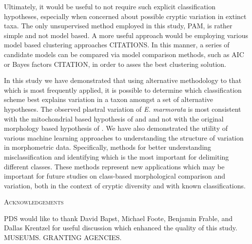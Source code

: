 \documentclass[12pt,letterpaper]{article}\usepackage{graphicx, color}
\renewcommand{\section}[1]{%
\bigskip
\begin{center}
\begin{Large}
\normalfont\scshape #1
\medskip
\end{Large}
\end{center}}
\begin{document}
Ultimately, it would be useful to not require such explicit classification hypotheses, especially when concerned about possible cryptic variation in extinct taxa. The only unsupervised method employed in this study, PAM, is rather simple and not model based. A more useful approach would be employing various model based clustering approaches CITATIONS. In this manner, a series of candidate models can be compared via model comparison methods, such as AIC or Bayes factors CITATION, in order to asses the best clustering solution.%


In this study we have demonstrated that using alternative methodology to that which is most frequently applied, it is possible to determine which classification scheme best explains variation in a taxon amongst a set of alternative hypotheses. The observed plastral variation of \textit{E. marmorata} is most consistent with the mitochondrial based hypothesis of \citet{Spinks2005} and \citet{Spinks2010} and not with the original morphology based hypothesis of \citet{Seeliger1945}. We have also demonstrated the utility of various machine learning approaches to understanding the structure of variation in morphometric data. Specifically, methods for better understanding misclassification and identifying which is the most important for delimiting different classes. These methods represent new applications which may be important for future studies on class-based morphological comparison and variation, both in the context of cryptic diversity and with known classifications.

\section{Acknowledgements}
PDS would like to thank David Bapst, Michael Foote, Benjamin Frable, and Dallas Krentzel for useful discussion which enhanced the quality of this study. MUSEUMS. GRANTING AGENCIES.
\end{document}

